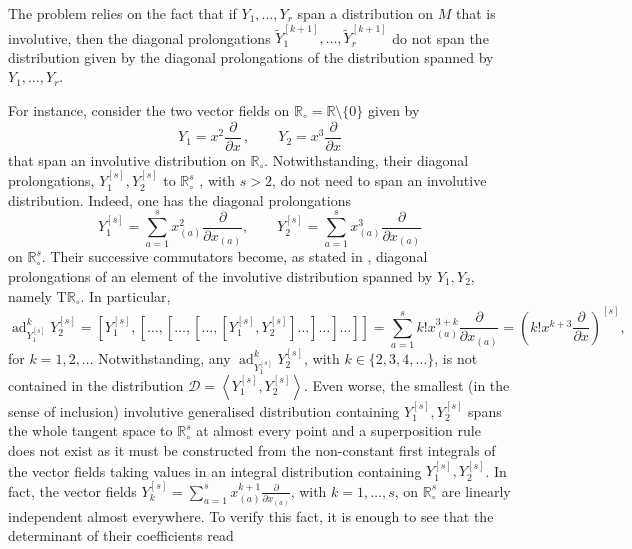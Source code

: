 \documentclass[11pt]{article}
\theoremstyle{plain}
\theoremstyle{definition}
\newcommand{\T}{\mathrm{T}}
\DeclareMathOperator{\ad}{ad}
\begin{document}
The problem relies on the fact that if $Y_1,\dotsc,Y_r$ span a distribution on $M$ that is involutive, then the diagonal prolongations $\widetilde Y^{[k+1]}_1,\ldots,\widetilde Y^{[k+1]}_r$ do not span the distribution given by the diagonal prolongations of the distribution spanned by $Y_1,\ldots,Y_r$. 

 
For instance, consider the two vector fields on $\mathbb{R}_\circ=\mathbb{R}\setminus\{0\}$ given by
$$
Y_1=x^2\frac{\partial}{\partial x}\,,\qquad Y_2=x^3\frac{\partial}{\partial x}
$$
that span an involutive distribution on $\mathbb{R}_\circ$. %
Notwithstanding, their diagonal prolongations, $ {Y}^{[s]}_1, {Y}^{[s]}_2$ to $\mathbb{R}_\circ^s$ , with $s>2$, do not need to span an involutive distribution. Indeed, one has the diagonal prolongations
$$
 {Y}_1^{[s]}=\sum_{a=1}^sx_{(a)}^2\frac{\partial}{\partial x_{(a)}},\qquad  {Y}_2^{[s]}=\sum_{a=1}^s x_{(a)}^3\frac{\partial}{\partial x_{(a)}}
$$
on $\mathbb{R}^s_\circ$. Their successive commutators become, as stated in \cite{LO09}, diagonal prolongations of an element of the involutive distribution spanned by $Y_1,Y_2$, namely $\T \mathbb{R}_\circ$. In particular,
$$
\ad_{ {Y}^{[s]}_1}^k {Y}^{[s]}_2=\left[ {Y}_1^{[s]},[
\ldots,[\ldots,[\ldots, [ {Y}_1^{[s]}, {Y}_2^{[s]}]\ldots]\ldots]\ldots]\right]=
\sum_{a=1}^sk!x_{(a)}^{3+k}\frac{\partial}{\partial x_{(a)}}=\left(k!x^{k+3}\frac{\partial}{\partial x}\right)^{[s]},
$$
for $k=1,2,\ldots$
Notwithstanding, any $\ad_{ {Y}^{[s]}_1}^k {Y}^{[s]}_2$, with $k\in \{2,3,4,\ldots\}$, is not contained in the distribution $\mathcal{D}=\left\langle  {Y}^{[s]}_1, {Y}^{[s]}_2\right\rangle$. Even worse, the smallest  (in the sense of inclusion) involutive  generalised distribution containing $ {Y}^{[s]}_1, {Y}^{[s]}_2$ spans the whole tangent space to $\mathbb{R}_\circ^s$ at almost every point and a superposition rule does not exist as it must be constructed from the non-constant first integrals of the vector fields taking values in an integral distribution containing  $ {Y}^{[s]}_1, {Y}^{[s]}_2$.  In fact, the vector fields $ {Y}^{[s]}_{k}=\sum_{a=1}^sx_{(a)}^{k+1}\frac{\partial}{\partial x_{(a)}}$, with $k=1,\ldots,s$, on $\mathbb{R}_\circ^s$ are linearly independent almost everywhere. To verify this fact, it is enough to see that the determinant of their coefficients read
\end{document}
